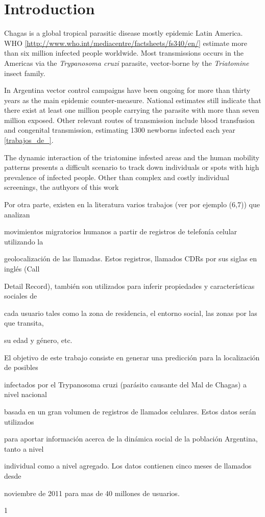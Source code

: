 \section{Introduction}

Chagas is a global tropical parasitic disease mostly epidemic Latin America. WHO \ref{http://www.who.int/mediacentre/factsheets/fs340/en/} estimate more than six million infected people worldwide. Most transmissions occurs in the Americas via the \textit{Trypanosoma cruzi} parasite, vector-borne by the \textit{Triatomine} insect family.

In Argentina vector control campaigns have been ongoing for more than thirty years as the main epidemic counter-measure. National estimates still indicate that there exist at least one million people carrying the parasite with more than seven million exposed.
Other relevant routes of transmission include blood transfusion and congenital transmission, estimating 1300 newborns infected each year \ref{trabajos_de_}.\begin{comment}  en el drive estan las ppt del min salud \end{comment}

The dynamic interaction of the triatomine infested areas and the human mobility patterns presents a difficult scenario to track down individuals or spots with high prevalence of infected people. Other than complex and costly individual screenings, the authyors of this work 


Por otra parte, existen en la literatura varios trabajos (ver por ejemplo (6,7)) que analizan

movimientos migratorios humanos a partir de registros de telefonía celular utilizando la

geolocalización de las llamadas. Estos registros, llamados CDRs por sus siglas en inglés (Call

Detail Record), también son utilizados para inferir propiedades y características sociales de

cada usuario tales como la zona de residencia, el entorno social, las zonas por las que transita,

su edad y género, etc.

El objetivo de este trabajo consiste en generar una predicción para la localización de posibles

infectados por el Trypanosoma cruzi (parásito causante del Mal de Chagas) a nivel nacional

basada en un gran volumen de registros de llamados celulares. Estos datos serán utilizados

para aportar información acerca de la dinámica social de la población Argentina, tanto a nivel

individual como a nivel agregado. Los datos contienen cinco meses de llamados desde

noviembre de 2011 para mas de 40 millones de usuarios.

1
